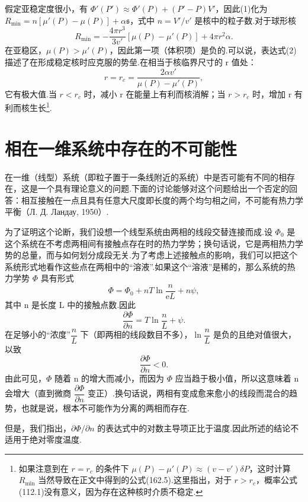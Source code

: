 \begin{xiti}
假定亚稳定度很小，有 $\Phi'(P')\approx\Phi'(P)+(P'-P)V'$，因此(1)化为 $R_{\mathrm{min}}=n[\mu'(P)-\mu(P)]+\alpha\mathfrak{s}$，式中 $n=V'/v'$ 是核中的粒子数.对于球形核
\begin{equation*}
  R_{\mathrm{min}}=-\frac{4\pi r^3}{3v'}\left[\mu(P)-\mu'(P)\right]
  +4\pi r^2\alpha.
\tag{2}
\end{equation*}
在亚稳区，$\mu(P)>\mu'(P)$，因此第一项（体积项）是负的.可以说，表达式(2)描述了在形成稳定核时应克服的势垒.在相当于核临界尺寸的 r 值处：
\begin{equation*}
  r=r_c=\frac{2\alpha v'}{\mu(P)-\mu'(P)},
\end{equation*}
它有极大值.当 $r<r_c$ 时，减小 r 在能量上有利而核消解；当 $r>r_c$ 时，增加 r 有利而核生长\footnote{如果注意到在 $r=r_c$ 的条件下 $\mu(P)-\mu'(P)\approx(v-v')\delta P$，这时计算 $R_{\min}$ 当然导致在正文中得到的公式(162.5).这里指出，对于 $r>r_c$，概率公式(112.1)没有意义，因为存在这种核时介质不稳定.}.

\end{xiti}

\section{相在一维系统中存在的不可能性}

在一维（线型）系统（即粒子置于一条线附近的系统）中是否可能有不同的相存在，这是一个具有理论意义的问题.下面的讨论能够对这个问题给出一个否定的回答：相互接触在一点且具有任意大尺度即长度的两个均匀相之间，不可能有热力学平衡（Л. Д. Ландау, 1950）.

为了证明这个论断，我们设想一个线型系统由两相的线段交替连接而成.设 $\Phi_0$ 是这个系统在不考虑两相间有接触点存在时的热力学势；换句话说，它是两相热力学势的总量，而与如何划分成段无关.为了考虑上述接触点的影响，我们可以把这个系统形式地看作这些点在两相中的“溶液”.如果这个“溶液”是稀的，那么系统的热力学势 $\Phi$ 具有形式
\begin{equation*}
  \Phi=\Phi_0+nT\ln\frac{n}{\mathrm{e}L}+n\psi,
\end{equation*}
其中 n 是长度 L 中的接触点数.因此
\begin{equation*}
  \frac{\partial\Phi}{\partial n}=T\ln\frac{n}{L}+\psi.
\end{equation*}
在足够小的“浓度”$\dfrac{n}{L}$ 下（即两相的线段数目不多），$\ln\dfrac{n}{L}$ 是负的且绝对值很大，以致
\begin{equation*}
  \frac{\partial\Phi}{\partial n}<0.
\end{equation*}
由此可见，$\Phi$ 随着 n 的增大而减小，而因为 $\Phi$ 应当趋于极小值，所以这意味着 n 会增大（直到微商 $\dfrac{\partial\Phi}{\partial n}$ 变正）.换句话说，两相有变成愈来愈小的线段而混合的趋势，也就是说，根本不可能作为分离的两相而存在.

但是，我们指出，$\partial\Phi/\partial n$ 的表达式中的对数主导项正比于温度.因此所述的结论不适用于绝对零度温度.
